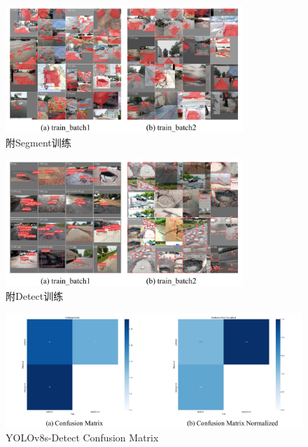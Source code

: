 \documentclass{MathorCupmodeling}
\begin{document}
\newpage
\begin{figure}[H]
	\centering
	\includegraphics[width=0.8\textwidth]{Figures/segment/附Segment训练.pdf}
	\caption{附Segment训练}
	\label{fig:附Segment训练}
\end{figure}
\begin{figure}[H]
	\centering
	\includegraphics[width=0.8\textwidth]{Figures/detect/附Detect训练.pdf}
	\caption{附Detect训练}
	\label{fig:附Detect训练}
\end{figure}
\begin{figure}[H]
	\centering
	\includegraphics[scale=0.66]{Figures/detect/DetectConfusionMatrix.pdf}
	\caption{YOLOv8s-Detect Confusion Matrix}
	\label{fig:YOLOv8s-Detect-Confusion-Matrix}
\end{figure}
\end{document}
